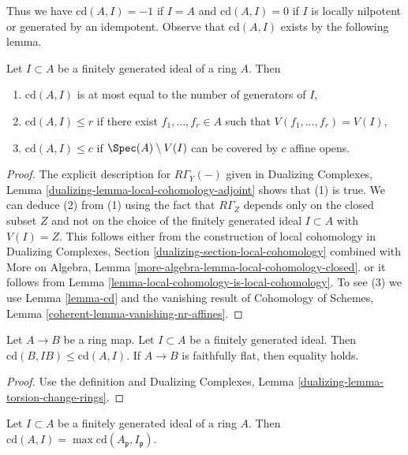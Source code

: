 \noindent
Thus we have $\text{cd}(A, I) = -1$ if
$I = A$ and $\text{cd}(A, I) = 0$ if $I$ is locally nilpotent
or generated by an idempotent.
Observe that $\text{cd}(A, I)$ exists by the following lemma.

\begin{lemma}
\label{lemma-bound-cd}
Let $I \subset A$ be a finitely generated ideal of a ring $A$.
Then
\begin{enumerate}
\item $\text{cd}(A, I)$ is at most equal to the number of
generators of $I$,
\item $\text{cd}(A, I) \leq r$ if there exist $f_1, \ldots, f_r \in A$
such that $V(f_1, \ldots, f_r) = V(I)$,
\item $\text{cd}(A, I) \leq c$ if $\Spec(A) \setminus V(I)$
can be covered by $c$ affine opens.
\end{enumerate}
\end{lemma}

\begin{proof}
The explicit description for $R\Gamma_Y(-)$ given in
Dualizing Complexes, Lemma \ref{dualizing-lemma-local-cohomology-adjoint}
shows that (1) is true. We can deduce (2) from (1) using the
fact that $R\Gamma_Z$ depends only on the closed subset
$Z$ and not on the choice of the finitely generated ideal
$I \subset A$ with $V(I) = Z$. This follows either from the
construction of local cohomology in
Dualizing Complexes, Section \ref{dualizing-section-local-cohomology}
combined with
More on Algebra, Lemma \ref{more-algebra-lemma-local-cohomology-closed}.
or it follows from Lemma \ref{lemma-local-cohomology-is-local-cohomology}.
To see (3) we use Lemma \ref{lemma-cd}
and the vanishing result of Cohomology of Schemes, Lemma
\ref{coherent-lemma-vanishing-nr-affines}.
\end{proof}

\begin{lemma}
\label{lemma-cd-change-rings}
Let $A \to B$ be a ring map. Let $I \subset A$ be a finitely generated ideal.
Then $\text{cd}(B, IB) \leq \text{cd}(A, I)$. If $A \to B$ is faithfully
flat, then equality holds.
\end{lemma}

\begin{proof}
Use the definition and
Dualizing Complexes, Lemma \ref{dualizing-lemma-torsion-change-rings}.
\end{proof}

\begin{lemma}
\label{lemma-cd-local}
Let $I \subset A$ be a finitely generated ideal of a ring $A$.
Then $\text{cd}(A, I) = \max \text{cd}(A_\mathfrak p, I_\mathfrak p)$.
\end{lemma}

